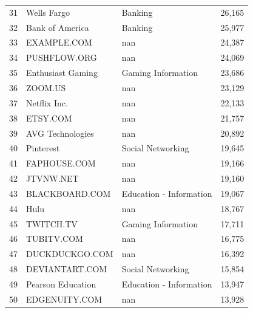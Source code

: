 \begin{tabular}{rlll}
  31 & Wells Fargo & Banking & 26,165 \\
  32 & Bank of America & Banking & 25,977 \\
  33 & EXAMPLE.COM & nan & 24,387 \\
  34 & PUSHFLOW.ORG & nan & 24,069 \\
  35 & Enthusiast Gaming & Gaming Information & 23,686 \\
  36 & ZOOM.US & nan & 23,129 \\
  37 & Netflix Inc. & nan & 22,133 \\
  38 & ETSY.COM & nan & 21,757 \\
  39 & AVG Technologies & nan & 20,892 \\
  40 & Pinterest & Social Networking & 19,645 \\
  41 & FAPHOUSE.COM & nan & 19,166 \\
  42 & JTVNW.NET & nan & 19,160 \\
  43 & BLACKBOARD.COM & Education - Information & 19,067 \\
  44 & Hulu & nan & 18,767 \\
  45 & TWITCH.TV & Gaming Information & 17,711 \\
  46 & TUBITV.COM & nan & 16,775 \\
  47 & DUCKDUCKGO.COM & nan & 16,392 \\
  48 & DEVIANTART.COM & Social Networking & 15,854 \\
  49 & Pearson Education & Education - Information & 13,947 \\
  50 & EDGENUITY.COM & nan & 13,928 \\
\bottomrule
\end{tabular}
